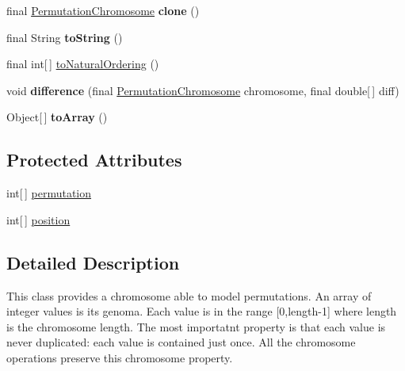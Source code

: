 \begin{CompactItemize}
\item 
\hypertarget{classjenes_1_1chromosome_1_1_permutation_chromosome_026be97457b0600bf9c4467e34073e93}{
final \hyperlink{classjenes_1_1chromosome_1_1_permutation_chromosome}{PermutationChromosome} \textbf{clone} ()}
\label{classjenes_1_1chromosome_1_1_permutation_chromosome_026be97457b0600bf9c4467e34073e93}

\item 
\hypertarget{classjenes_1_1chromosome_1_1_permutation_chromosome_63f526a0f6f85fda55f2bcacbacd2072}{
final String \textbf{toString} ()}
\label{classjenes_1_1chromosome_1_1_permutation_chromosome_63f526a0f6f85fda55f2bcacbacd2072}

\item 
final int\mbox{[}$\,$\mbox{]} \hyperlink{classjenes_1_1chromosome_1_1_permutation_chromosome_0aeb1df52bf751baa4706e5d94dae60d}{toNaturalOrdering} ()
\item 
\hypertarget{classjenes_1_1chromosome_1_1_permutation_chromosome_20c34256408cab0b265d69decd40dabd}{
void \textbf{difference} (final \hyperlink{classjenes_1_1chromosome_1_1_permutation_chromosome}{PermutationChromosome} chromosome, final double\mbox{[}$\,$\mbox{]} diff)}
\label{classjenes_1_1chromosome_1_1_permutation_chromosome_20c34256408cab0b265d69decd40dabd}

\item 
\hypertarget{classjenes_1_1chromosome_1_1_permutation_chromosome_8b14d4ba9c616335a901103f1879569a}{
Object\mbox{[}$\,$\mbox{]} \textbf{toArray} ()}
\label{classjenes_1_1chromosome_1_1_permutation_chromosome_8b14d4ba9c616335a901103f1879569a}

\end{CompactItemize}
\subsection*{Protected Attributes}
\begin{CompactItemize}
\item 
int\mbox{[}$\,$\mbox{]} \hyperlink{classjenes_1_1chromosome_1_1_permutation_chromosome_8b5701fbbb3cdfef29d346e0375260fc}{permutation}
\item 
int\mbox{[}$\,$\mbox{]} \hyperlink{classjenes_1_1chromosome_1_1_permutation_chromosome_eb2d393eb8a9cc106205e13fb88446cc}{position}
\end{CompactItemize}


\subsection{Detailed Description}
This class provides a chromosome able to model permutations. An array of integer values is its genoma. Each value is in the range \mbox{[}0,length-1\mbox{]} where length is the chromosome length. The most importatnt property is that each value is never duplicated: each value is contained just once. All the chromosome operations preserve this chromosome property.


